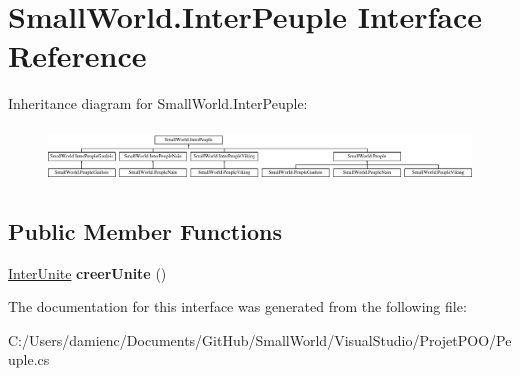 \hypertarget{interface_small_world_1_1_inter_peuple}{\section{Small\-World.\-Inter\-Peuple Interface Reference}
\label{interface_small_world_1_1_inter_peuple}
}
Inheritance diagram for Small\-World.\-Inter\-Peuple\-:\begin{figure}[H]
\begin{center}
\leavevmode
\includegraphics[height=1.450777cm]{interface_small_world_1_1_inter_peuple}
\end{center}
\end{figure}
\subsection*{Public Member Functions}
\begin{DoxyCompactItemize}
\item 
\hypertarget{interface_small_world_1_1_inter_peuple_a7d0a3a0b572df062740509b9d20499e7}{\hyperlink{interface_small_world_1_1_inter_unite}{Inter\-Unite} {\bfseries creer\-Unite} ()}\label{interface_small_world_1_1_inter_peuple_a7d0a3a0b572df062740509b9d20499e7}

\end{DoxyCompactItemize}


The documentation for this interface was generated from the following file\-:\begin{DoxyCompactItemize}
\item 
C\-:/\-Users/damienc/\-Documents/\-Git\-Hub/\-Small\-World/\-Visual\-Studio/\-Projet\-P\-O\-O/Peuple.\-cs\end{DoxyCompactItemize}
